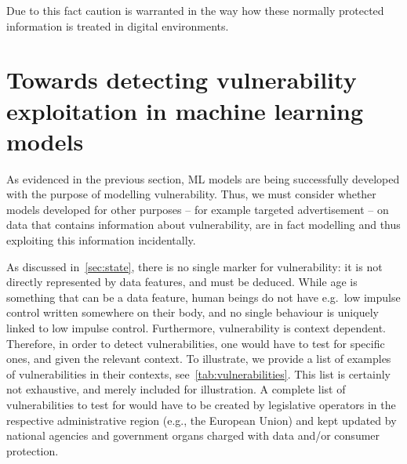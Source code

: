 \documentclass[11pt,theapa]{article}
\theoremstyle{plain}
\newcommand{\vulnerability}{{low impulse control}} %
\begin{document}
Due to this fact caution is warranted in the way how these normally protected information is treated in digital environments.

\section{Towards detecting vulnerability exploitation in machine learning models}\label{sec:approach}
As evidenced in the previous section, ML models are being successfully developed with the purpose of modelling vulnerability. Thus, we must consider whether models developed for other purposes -- for example targeted advertisement -- on data that contains information about vulnerability, are in fact modelling and thus exploiting this information incidentally.

As discussed in~\cref{sec:state}, there is no single marker for vulnerability: it is not directly represented by data features, and must be deduced. While age is something that can be a data feature, human beings do not have e.g.\ \vulnerability{} written somewhere on their body, and no single behaviour is uniquely linked to \vulnerability{}. Furthermore, vulnerability is context dependent. Therefore, in order to detect vulnerabilities, one would have to test for specific ones, and given the relevant context. To illustrate, we provide a list of examples of vulnerabilities in their contexts, see~\cref{tab:vulnerabilities}. This list is certainly not exhaustive, and merely included for illustration. A complete list of vulnerabilities to test for would have to be created by legislative operators in the respective administrative region (e.g., the European Union) and kept updated by national agencies and government organs charged with data and/or consumer protection.
\end{document}

